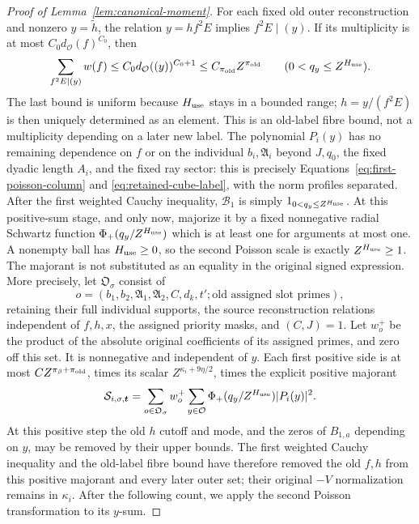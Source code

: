 \documentclass[12pt]{article}
\begin{document}
\begin{proof}[Proof of Lemma~\ref{lem:canonical-moment}]
For each fixed old outer reconstruction and nonzero \(y=\widetilde h\),
the relation \(y=hf^2E\) implies \(f^2E\mid(y)\).  If its multiplicity
is at most \(C_0d_{\mathcal O}(f)^{C_0}\), then
\begin{equation}\label{eq:inverse-old-label-fibre}
 \sum_{f^2E\mid(y)}w(f)
 \le C_0d_{\mathcal O}((y))^{C_0+1}
 \le C_{\pi_{\rm old}}Z^{\pi_{\rm old}}
 \qquad(0<q_y\le Z^{H_{\rm use}}).
\end{equation}
The last bound is uniform because \(H_{\rm use}\) stays in a bounded
range; \(h=y/(f^2E)\) is then uniquely determined as an element.
This is an old-label fibre bound, not a multiplicity depending on a
later new label.
The polynomial \(P_i(y)\) has no remaining dependence on \(f\) or on
the individual \(b_i,\mathfrak A_i\) beyond \(J,q_0\), the fixed
dyadic length \(A_i\), and the fixed ray sector: this is precisely
Equations~\eqref{eq:first-poisson-column} and
\eqref{eq:retained-cube-label}, with the norm profiles separated.
After the first weighted Cauchy inequality, \(\mathcal B_1\) is simply
\(1_{0<q_y\le Z^{H_{\rm use}}}\).  At this positive-sum stage, and only
now, majorize it by a fixed nonnegative radial Schwartz function
\(\Phi_+(q_y/Z^{H_{\rm use}})\) which is at least one for arguments at
most one.  A nonempty ball has \(H_{\rm use}\ge0\), so the second Poisson
scale is exactly \(Z^{H_{\rm use}}\ge1\).  The majorant is not substituted
as an equality in the original signed expression.  More precisely, let
\(\mathfrak O_\sigma\) consist of
\[
 o=(b_1,b_2,\mathfrak A_1,\mathfrak A_2,C,d_k,t';
       \text{old assigned slot primes}),
\]
retaining their full individual supports, the source reconstruction
relations independent of \(f,h,x\), the assigned priority masks, and
\((C,J)=1\).  Let \(w_o^+\) be the product of the absolute original
coefficients of its assigned primes, and zero off this set.  It is
nonnegative and independent of \(y\).  Each first positive side is at
most \(C Z^{\pi_\beta+\pi_{\rm old}}\), times its scalar
\(Z^{\kappa_i+9\eta/2}\), times the explicit positive majorant
\begin{equation}\label{eq:inverse-first-majorant}
 \mathcal S_{i,\sigma,\boldsymbol t}
 =\sum_{o\in\mathfrak O_\sigma}w_o^+
    \sum_{y\in\mathcal O}\Phi_+(q_y/Z^{H_{\rm use}})|P_i(y)|^2.
\end{equation}
At this positive step the old \(h\) cutoff and mode, and the zeros of
\(B_{1,a}\) depending on \(y\), may be removed by their upper bounds.
The first weighted Cauchy inequality and the old-label fibre bound have
therefore removed the old \(f,h\) from this positive majorant and every
later outer set; their original \(-V\) normalization remains in
\(\kappa_i\).  After the following count, we apply the second Poisson
transformation to its \(y\)-sum.


\end{proof}
\end{document}
